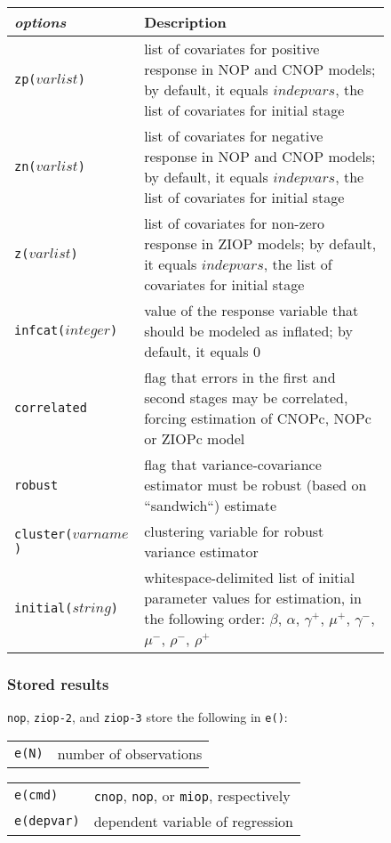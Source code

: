 \documentclass[letterpaper,fleqn,12pt]{article}
\begin{document}
\begin{figure}[H]
\begin{onehalfspace}
\begin{tabular}{lp{12cm}}
\textit{options} & Description \\ 
\midrule\texttt{zp($varlist$)} & list of covariates for positive response in
NOP and CNOP models; by default, it equals $indepvars$, the list of
covariates for initial stage \\ 
\texttt{zn($varlist$)} & list of covariates for negative response in NOP and
CNOP models; by default, it equals $indepvars$, the list of covariates for
initial stage \\ 
\texttt{z($varlist$)} & list of covariates for non-zero response in ZIOP
models; by default, it equals $indepvars$, the list of covariates for
initial stage \\ 
\texttt{infcat($integer$)} & value of the response variable that should be
modeled as inflated; by default, it equals 0 \\ 
\texttt{correlated} & flag that errors in the first and second stages may be
correlated, forcing estimation of CNOPc, NOPc or ZIOPc model \\ 
\texttt{robust} & flag that variance-covariance estimator must be robust
(based on \textquotedblleft sandwich\textquotedblleft ) estimate \\ 
\texttt{cluster($varname$)} & clustering variable for robust variance
estimator \\ 
\texttt{initial($string$)} & whitespace-delimited list of initial parameter
values for estimation, in the following order: $\beta $, $\alpha $, $\gamma
^{+}$, $\mu ^{+}$, $\gamma ^{-}$, $\mu ^{-}$, $\rho ^{-}$, $\rho ^{+}$%
\end{tabular}

\subsubsection*{Stored results}

\texttt{nop}, \texttt{ziop-2}, and \texttt{ziop-3} store the following in 
\texttt{e()}:


\begin{tabular}{p{3cm}p{12cm}}
\texttt{e(N)} & number of observations%
\end{tabular}


\begin{tabular}{p{3.12cm}p{12cm}}
\texttt{e(cmd)} & \texttt{cnop}, \texttt{nop}, or \texttt{miop}, respectively
\\ 
\texttt{e(depvar)} & dependent variable of regression%
\end{tabular}


\end{onehalfspace}
\end{figure}
\end{document}
